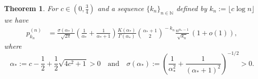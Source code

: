\documentclass[10pt,a4paper]{amsart}
\newtheorem{theorem}{Theorem}
\def\NN{\mathbb{N}}
\begin{document}
\begin{theorem}\label{thm:saddle}
    For $c\in(0,\frac{3}{4})$ and a sequence $\{k_n\}_{n\in\NN}$ defined by $k_n:=\lfloor c\log n\rfloor$ we have
    \begin{align*}
        p_{k_n}^{(n)} &= \frac{\sigma(\alpha_*)}{\sqrt{2\pi}} \left(\frac{1}{\alpha_*} + \frac{1}{\alpha_*+1}\right) \frac{K(\alpha_*)}{\Gamma(\alpha_*)} \binom{\alpha_*+1}{2}^{\!\!-k_n} 
            \frac{n^{\alpha_*-1}}{\sqrt{k_n}}\, (1+o(1)),
    \end{align*}
    where 
    \begin{equation*}
        \alpha_* := c-\frac{1}{2} + \frac{1}{2} \sqrt{4c^2+1}>0 \quad \text{and} \quad
        \sigma(\alpha_*) := \left(\frac{1}{\alpha_*^2} + \frac{1}{(\alpha_*+1)^2}\right)^{-1/2}>0.
    \end{equation*}
\end{theorem}
\end{document}

